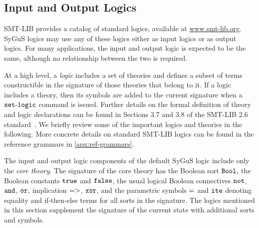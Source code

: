 \documentclass[english,a4paper,10pt]{article}
\begin{document}
\subsection{Input and Output Logics}
\label{ssec:smt-logic}

SMT-LIB provides a catalog of standard logics,
available at \url{www.smt-lib.org}.
SyGuS logics may use any of these logics
either as input logics or as output logics.
For many applications,
the input and output logic is expected to be the same, although
no relationship between the two is required.

At a high level, a \emph{logic} includes a set of theories
and defines a subset of terms constructible in the signature of those theories
that belong to it.
If a logic includes a theory, then its symbols are added
to the current signature when a ${\tt set\mbox{-}logic}$ command is issued.
Further details on the formal definition of 
theory and logic declarations can be found in Sections 3.7 and 3.8
of the SMT-LIB 2.6 standard~\cite{BarFT-RR-17}.
We briefly review some of the important logics and theories in the following.
More concrete details on
standard SMT-LIB logics can be found in the reference
grammars in \cref{apx:ref-grammars}.

The input and output logic components of the default SyGuS logic include only the
\emph{core theory}.
The signature of the core theory 
has the Boolean sort ${\tt Bool}$,
the Boolean constants ${\tt true}$ and ${\tt false}$, the
usual logical Boolean connectives 
${\tt not}$, ${\tt and}$, ${\tt or}$, implication ${\tt =>}$, ${\tt xor}$,
and the parametric symbols ${\tt =}$ and ${\tt ite}$
denoting equality and if-then-else terms for all sorts in the signature.
The logics mentioned in this section supplement the signature
of the current state with additional sorts and symbols.
\end{document}
